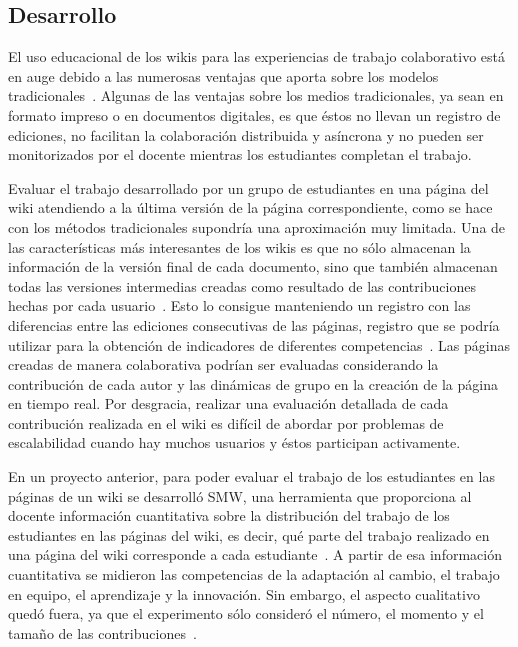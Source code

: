\subsection{Desarrollo}

	El uso educacional de los wikis para las experiencias de trabajo colaborativo está en auge debido a las numerosas ventajas que aporta sobre los modelos tradicionales~\cite{elgort2008wiki}. Algunas de las ventajas sobre los medios tradicionales, ya sean en formato impreso o en documentos digitales, es que éstos no llevan un registro de ediciones, no facilitan la colaboración distribuida y asíncrona y no pueden ser monitorizados por el docente mientras los estudiantes completan el trabajo.

	Evaluar el trabajo desarrollado por un grupo de estudiantes en una página del wiki atendiendo a la última versión de la página correspondiente, como se hace con los métodos tradicionales supondría una aproximación muy limitada. Una de las características más interesantes de los wikis es que no sólo almacenan la información de la versión final de cada documento, sino que también almacenan todas las versiones intermedias creadas como resultado de las contribuciones hechas por cada usuario~\cite{trentin2009using}. Esto lo consigue manteniendo un registro con las diferencias entre las ediciones consecutivas de las páginas, registro que se podría utilizar para la obtención de indicadores de diferentes competencias~\cite{ortega2011new}. Las páginas creadas de manera colaborativa podrían ser evaluadas considerando la contribución de cada autor y las dinámicas de grupo en la creación de la página en tiempo real. Por desgracia, realizar una evaluación detallada de cada contribución realizada en el wiki es difícil de abordar por problemas de escalabilidad cuando hay muchos usuarios y éstos participan activamente.

	En un proyecto anterior, para poder evaluar el trabajo de los estudiantes en las páginas de un wiki se desarrolló SMW, una herramienta que proporciona al docente información cuantitativa sobre la distribución del trabajo de los estudiantes en las páginas del wiki, es decir, qué parte del trabajo realizado en una página del wiki corresponde a cada estudiante~\cite{duarte2012wikis}.  A partir de esa información cuantitativa se midieron las competencias de la adaptación al cambio, el trabajo en equipo, el aprendizaje y la innovación. Sin embargo, el aspecto cualitativo quedó fuera, ya que el experimento sólo consideró el número, el momento y el tamaño de las contribuciones~\cite{palomo2014assessment}.

